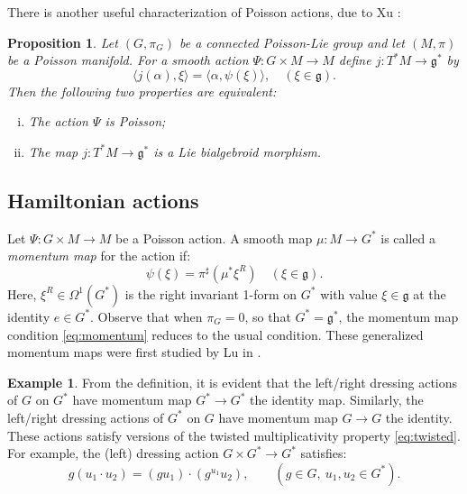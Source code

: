 \documentclass[a4paper,11pt]{amsart}
\newtheorem{prop}[thm]{Proposition}
\theoremstyle{definition}
\newtheorem{ex}[thm]{Example}
\theoremstyle{remark}
\begin{document}
There is another useful characterization of Poisson actions, due to Xu \cite{Xu0}:

\begin{prop}
\label{prop:Poisson:actions:2}
Let $(G,\pi_G)$ be a connected Poisson-Lie group and let $(M,\pi)$ be a Poisson manifold. For a smooth action
$\Psi:G\times M\to M$ define $j:T^*M\to{\mathfrak{g}}^*$ by
\[ \langle j({\alpha}),\xi\rangle=\langle {\alpha},\psi(\xi)\rangle,\quad (\xi\in{\mathfrak{g}}).\]
Then the following two properties are equivalent:
\begin{enumerate}[(i)]
\item The action $\Psi$ is Poisson;
\item The map $j:T^*M\to{\mathfrak{g}}^*$ is a Lie bialgebroid morphism.
\end{enumerate}
\end{prop}

\subsection{Hamiltonian actions}                               \label{subsec:hamiltonian}                                     
Let $\Psi:G\times M\to M$ be a Poisson action. A smooth map
$\mu:M\to G^*$ is called a \emph{momentum map} for the
action if:
\begin{equation}
\label{eq:momentum}
\psi(\xi)=\pi^{\sharp}(\mu^*\xi^R)\quad (\xi\in{\mathfrak{g}}).
\end{equation}
Here, $\xi^R\in\Omega^1(G^*)$ is the right invariant 1-form on $G^*$ with value $\xi\in{\mathfrak{g}}$ at the identity
$e\in G^*$. Observe that when $\pi_G=0$, so that $G^*={\mathfrak{g}}^*$, the momentum map condition \eqref{eq:momentum}
reduces to the usual condition. These generalized momentum maps were first studied by Lu in \cite{Lu,Lu1}.

\begin{ex}
From the definition, it is evident that the left/right dressing actions of $G$ on $G^*$ have momentum map
$G^*\to G^*$ the identity map. Similarly, the left/right dressing actions of $G^*$ on $G$ have momentum map
$G\to G$ the identity. These actions satisfy versions of the twisted multiplicativity property
\eqref{eq:twisted}. For example, the (left) dressing action $G\times G^*\to G^*$ satisfies:
\begin{equation}
\label{eq:twist:dress}
g(u_1\cdot  u_2)=(g u_1)\cdot(g^{u_1} u_2),\qquad (g\in G,\ u_1,u_2\in G^*).
\end{equation}
\end{ex}
\end{document}
